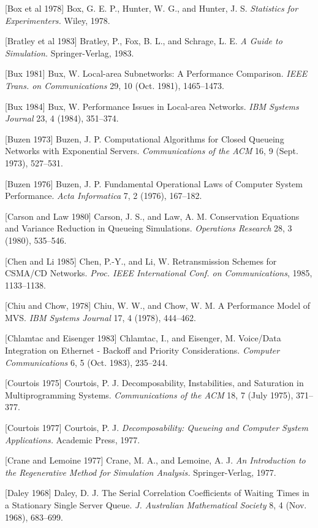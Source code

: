 [Box et al 1978] Box, G. E. P., Hunter, W. G., and Hunter, J. S. \textit{Statistics for Experimenters.} Wiley, 1978.

[Bratley et al 1983] Bratley, P., Fox, B. L., and Schrage, L. E. \textit{A Guide to Simulation.} Springer-Verlag, 1983.

[Bux 1981] Bux, W. Local-area Subnetworks: A Performance Comparison. \textit{IEEE Trans. on Communications} 29, 10 (Oct. 1981), 1465--1473.

[Bux 1984] Bux, W. Performance Issues in Local-area Networks. \textit{IBM Systems Journal} 23, 4 (1984), 351--374.

[Buzen 1973] Buzen, J. P. Computational Algorithms for Closed Queueing Networks with Exponential Servers. \textit{Communications of the ACM} 16, 9 (Sept. 1973), 527--531.

[Buzen 1976] Buzen, J. P. Fundamental Operational Laws of Computer System Performance. \textit{Acta Informatica} 7, 2 (1976), 167--182.

[Carson and Law 1980] Carson, J. S., and Law, A. M. Conservation Equations and Variance Reduction in Queueing Simulations. \textit{Operations Research} 28, 3 (1980), 535--546.

[Chen and Li 1985] Chen, P.-Y., and Li, W. Retransmission Schemes for CSMA/CD Networks. \textit{Proc. IEEE International Conf. on Communications}, 1985, 1133--1138.

[Chiu and Chow, 1978] Chiu, W. W., and Chow, W. M. A Performance Model of MVS. \textit{IBM Systems Journal} 17, 4 (1978), 444--462.

[Chlamtac and Eisenger 1983] Chlamtac, I., and Eisenger, M. Voice/Data Integration on Ethernet - Backoff and Priority Considerations. \textit{Computer Communications} 6, 5 (Oct. 1983), 235--244.

[Courtois 1975] Courtois, P. J. Decomposability, Instabilities, and Saturation in Multiprogramming Systems. \textit{Communications of the ACM} 18, 7 (July 1975), 371--377.

[Courtois 1977] Courtois, P. J. \textit{Decomposability: Queueing and Computer System Applications.} Academic Press, 1977.

[Crane and Lemoine 1977] Crane, M. A., and Lemoine, A. J. \textit{An Introduction to the Regenerative Method for Simulation Analysis.} Springer-Verlag, 1977.

[Daley 1968] Daley, D. J. The Serial Correlation Coefficients of Waiting Times in a Stationary Single Server Queue. \textit{J. Australian Mathematical Society} 8, 4 (Nov. 1968), 683--699.

